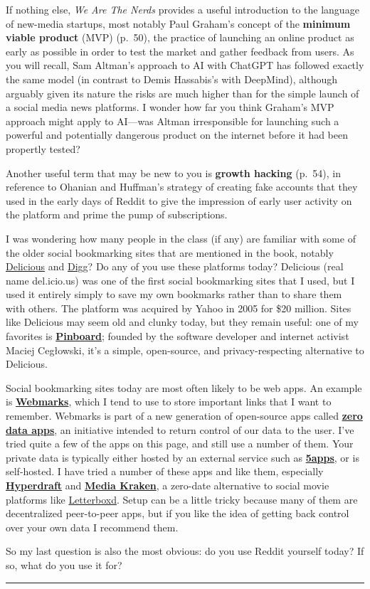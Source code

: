 \documentclass[
  letterpaper,
  DIV=11,
  numbers=noendperiod,
  oneside]{scrartcl}
\begin{document}
If nothing else, \emph{We Are The Nerds} provides a useful introduction
to the language of new-media startups, most notably Paul Graham's
concept of the \textbf{minimum viable product} (MVP) (p.~50), the
practice of launching an online product as early as possible in order to
test the market and gather feedback from users. As you will recall, Sam
Altman's approach to AI with ChatGPT has followed exactly the same model
(in contrast to Demis Hassabis's with DeepMind), although arguably given
its nature the risks are much higher than for the simple launch of a
social media news platforms. I wonder how far you think Graham's MVP
approach might apply to AI---was Altman irresponsible for launching such
a powerful and potentially dangerous product on the internet before it
had been propertly tested?

Another useful term that may be new to you is \textbf{growth hacking}
(p.~54), in reference to Ohanian and Huffman's strategy of creating fake
accounts that they used in the early days of Reddit to give the
impression of early user activity on the platform and prime the pump of
subscriptions.

I was wondering how many people in the class (if any) are familiar with
some of the older social bookmarking sites that are mentioned in the
book, notably
\href{https://en.wikipedia.org/wiki/Delicious_(website)}{Delicious} and
\href{https://en.wikipedia.org/wiki/Digg}{Digg}? Do any of you use these
platforms today? Delicious (real name del.icio.us) was one of the first
social bookmarking sites that I used, but I used it entirely simply to
save my own bookmarks rather than to share them with others. The
platform was acquired by Yahoo in 2005 for \$20 million. Sites like
Delicious may seem old and clunky today, but they remain useful: one of
my favorites is \href{https://pinboard.in/}{\textbf{Pinboard}}; founded
by the software developer and internet activist Maciej Cegłowski, it's a
simple, open-source, and privacy-respecting alternative to Delicious.

Social bookmarking sites today are most often likely to be web apps. An
example is \href{https://webmarks.5apps.com/about}{\textbf{Webmarks}},
which I tend to use to store important links that I want to remember.
Webmarks is part of a new generation of open-source apps called
\href{https://0data.app/glance}{\textbf{zero data apps}}, an initiative
intended to return control of our data to the user. I've tried quite a
few of the apps on this page, and still use a number of them. Your
private data is typically either hosted by an external service such as
\href{https://5apps.com/about}{\textbf{5apps}}, or is self-hosted. I
have tried a number of these apps and like them, especially
\href{https://hyperdraft.app/}{\textbf{Hyperdraft}} and
\href{https://noeldemartin.github.io/media-kraken/login}{\textbf{Media
Kraken}}, a zero-date alternative to social movie platforms like
\href{https://letterboxd.com/}{Letterboxd}. Setup can be a little tricky
because many of them are decentralized peer-to-peer apps, but if you
like the idea of getting back control over your own data I recommend
them.

So my last question is also the most obvious: do you use Reddit yourself
today? If so, what do you use it for?

\begin{center}\rule{0.5\linewidth}{0.5pt}\end{center}
\end{document}
